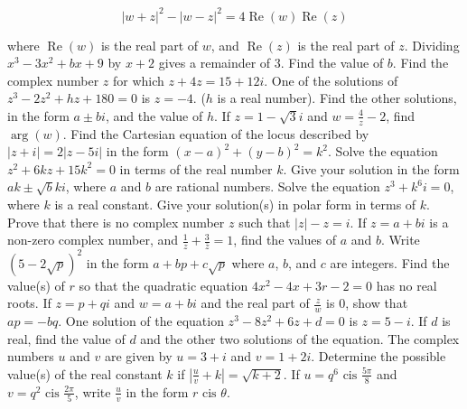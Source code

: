 \documentclass[12pt,addpoints]{exam}
\begin{document}
\begin{questions}
\[
|w + z|^2 - |w - z|^2 = 4 \operatorname{Re}(w) \operatorname{Re}(z)
\]

where \(\operatorname{Re}(w)\) is the real part of \( w \), and \(\operatorname{Re}(z)\) is the real part of \( z\).
\fillwithlines{5cm}
\question[5] Dividing \( x^3 - 3x^2 + bx + 9 \) by \( x + 2 \) gives a remainder of 3. Find the value of \( b \).
\fillwithlines{5cm}
\question[5] Find the complex number \( z \) for which \( z + 4z = 15 + 12i \).
\fillwithlines{5cm}
\question[5] One of the solutions of \( z^3 - 2z^2 + hz + 180 = 0 \) is \( z = -4 \). (\( h \) is a real number). Find the other solutions, in the form \( a \pm bi \), and the value of \( h \).
\fillwithlines{5cm}
\question[5] If \( z = 1 - \sqrt{3}i \) and \( w = \frac{4}{z} - 2 \), find \(\arg(w)\).
\fillwithlines{5cm}
\question[5] Find the Cartesian equation of the locus described by \( |z + i| = 2|z - 5i| \) in the form \((x-a)^2 + (y-b)^2 = k^2\).
\fillwithlines{5cm}
\question[5] Solve the equation \( z^2 + 6kz + 15k^2 = 0 \) in terms of the real number \( k \). Give your solution in the form \( ak \pm \sqrt{b}ki \), where \( a \) and \( b \) are rational numbers.
\fillwithlines{5cm}
\question[5] Solve the equation \( z^3 + k^6i = 0 \), where \( k \) is a real constant. Give your solution(s) in polar form in terms of \( k \).
\fillwithlines{5cm}
\question[5] Prove that there is no complex number \( z \) such that \( |z| - z = i \).
\fillwithlines{5cm}
\question[5] If \( z = a + bi \) is a non-zero complex number, and \( \frac{1}{z} + \frac{3}{\overline{z}} = 1 \), find the values of \( a \) and \( b \).
\fillwithlines{5cm}
\question[5] Write \((5 - 2\sqrt{p})^2\) in the form \(a + bp + c\sqrt{p}\) where \(a\), \(b\), and \(c\) are integers.
\fillwithlines{5cm}
\question[5] Find the value(s) of \( r \) so that the quadratic equation \( 4x^2 - 4x + 3r - 2 = 0 \) has no real roots.
\fillwithlines{5cm}
\question[5] If \( z = p + qi \) and \( w = a + bi \) and the real part of \( \frac{z}{w} \) is 0, show that \( ap = -bq \).
\fillwithlines{5cm}
\question[5] One solution of the equation \( z^3 - 8z^2 + 6z + d = 0 \) is \( z = 5 - i \). If \( d \) is real, find the value of \( d \) and the other two solutions of the equation.
\fillwithlines{5cm}
\question[5] The complex numbers \( u \) and \( v \) are given by \( u = 3 + i \) and \( v = 1 + 2i \). Determine the possible value(s) of the real constant \( k \) if \(\left| \frac{u}{v} + k \right| = \sqrt{k + 2}\).
\fillwithlines{5cm}
\question[5] If \( u = q^6 \text{ cis } \frac{5\pi}{8} \) and \( v = q^2 \text{ cis } \frac{2\pi}{5} \), write \( \frac{u}{v} \) in the form \( r \text{ cis } \theta \).

\end{questions}
\end{document}
